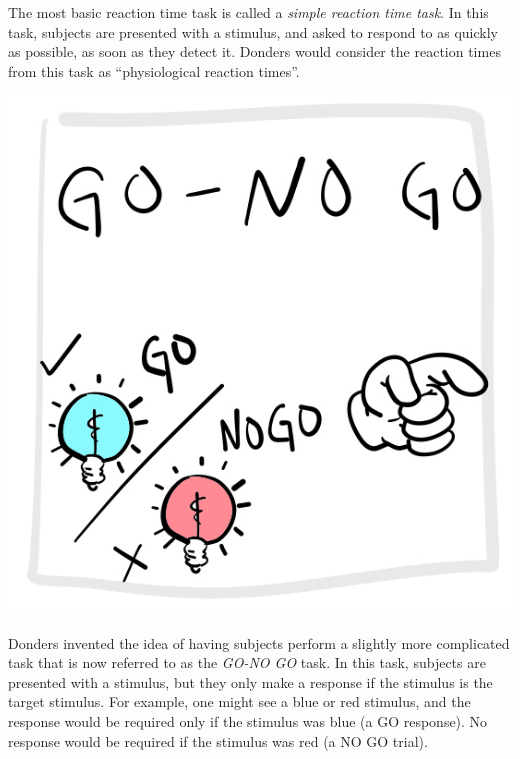 \documentclass[
  oneside,
  12pt]{crumpbook}
\newenvironment{floatright25}{%
  \wrapfigure{R}{.25\textwidth}%
  }{%
  \endwrapfigure}
\begin{document}
The most basic reaction time task is called a \emph{simple reaction time task}. In this task, subjects are presented with a stimulus, and asked to respond to as quickly as possible, as soon as they detect it. Donders would consider the reaction times from this task as ``physiological reaction times''.

\begin{floatright25}
\includegraphics[width=1\linewidth]{imgs/Donders_GoNoGo}

\end{floatright25}

Donders invented the idea of having subjects perform a slightly more complicated task that is now referred to as the \emph{GO-NO GO} task. In this task, subjects are presented with a stimulus, but they only make a response if the stimulus is the target stimulus. For example, one might see a blue or red stimulus, and the response would be required only if the stimulus was blue (a GO response). No response would be required if the stimulus was red (a NO GO trial).
\end{document}
